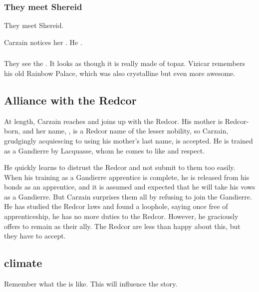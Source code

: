 \subsubsection{They meet Shereid}
They meet Shereid. 

Carzain notices her . 
He . 




\subsubsection{\TopazChateau}
They see the .
It looks as though it is really made of topaz.
Vizicar remembers his old Rainbow Palace, which was also crystalline but even more awesome. 









\subsection{Alliance with the Redcor}
At length, Carzain reaches \Redce{} and joins up with the Redcor. His mother is Redcor-born, and her name, \Deracille, is a Redcor name of the lesser nobility, so Carzain, grudgingly acquiescing to using his mother's last name, is accepted. He is trained as a Gandierre by Lacquasse, whom he comes to like and respect. 

He quickly learns to distrust the Redcor and not submit to them too easily. When his training as a Gandierre apprentice is complete, he is released from his bonds as an apprentice, and it is assumed and expected that he will take his vows as a Gandierre. But Carzain surprises them all by refusing to join the Gandierre. He has studied the Redcor laws and found a loophole, saying once free of apprenticeship, he has no more duties to the Redcor. However, he graciously offers to remain as their ally. The Redcor are less than happy about this, but they have to accept. 










\subsection{\Redcean climate}
Remember what the  is like. 
This will influence the story. 









